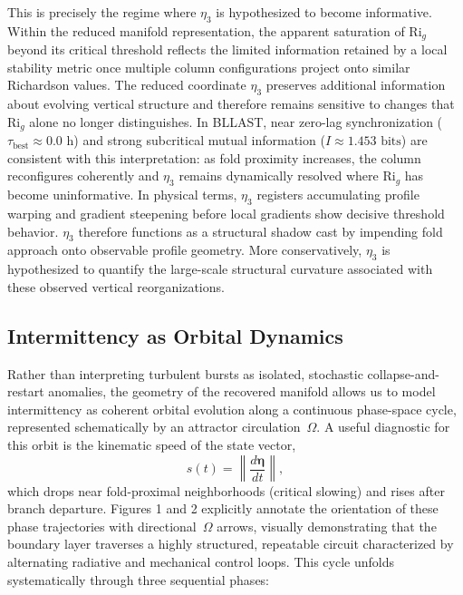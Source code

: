 \documentclass[12pt,a4paper]{article}
\newcommand{\Rig}{\mathrm{Ri}_g}
\begin{document}
This is precisely the regime where $\eta_3$ is hypothesized to become informative. Within the reduced manifold representation, the apparent saturation of $\Rig$ beyond its critical threshold reflects the limited information retained by a local stability metric once multiple column configurations project onto similar Richardson values. The reduced coordinate $\eta_3$ preserves additional information about evolving vertical structure and therefore remains sensitive to changes that $\Rig$ alone no longer distinguishes. In BLLAST, near zero-lag synchronization ($\tau_{\text{best}} \approx 0.0\text{~h}$) and strong subcritical mutual information ($I \approx 1.453\text{~bits}$) are consistent with this interpretation: as fold proximity increases, the column reconfigures coherently and $\eta_3$ remains dynamically resolved where $\Rig$ has become uninformative. In physical terms, $\eta_3$ registers accumulating profile warping and gradient steepening before local gradients show decisive threshold behavior. $\eta_3$ therefore functions as a structural shadow cast by impending fold approach onto observable profile geometry. More conservatively, $\eta_3$ is hypothesized to quantify the large-scale structural curvature associated with these observed vertical reorganizations.

\subsection{Intermittency as Orbital Dynamics}

Rather than interpreting turbulent bursts as isolated, stochastic collapse-and-restart anomalies, the geometry of the recovered manifold allows us to model intermittency as coherent orbital evolution along a continuous phase-space cycle, represented schematically by an attractor circulation~$\Omega$. A useful diagnostic for this orbit is the kinematic speed of the state vector,
\begin{equation}
s(t) = \left\|\frac{d\boldsymbol{\eta}}{dt}\right\|,
\end{equation}
which drops near fold-proximal neighborhoods (critical slowing) and rises after branch departure. Figures 1 and 2 explicitly annotate the orientation of these phase trajectories with directional~$\Omega$ arrows, visually demonstrating that the boundary layer traverses a highly structured, repeatable circuit characterized by alternating radiative and mechanical control loops. This cycle unfolds systematically through three sequential phases:
\end{document}
